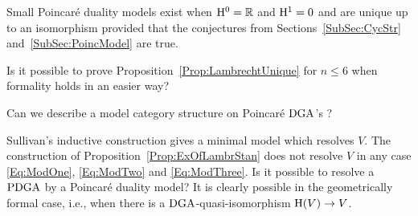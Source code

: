 \documentclass[\MainFolder/Text.tex]{subfiles}
\begin{document}
\begin{Corollary}\label{Cor:SmalPoinc}
Small Poincar\'e duality models exist when $\mathrm{H}^0 = \mathbb{R}$ and $\mathrm{H}^1 = 0$ and are unique up to an isomorphism provided that the conjectures from Sections~\ref{SubSec:CycStr} and~\ref{SubSec:PoincModel} are true.
\end{Corollary}

\begin{Questions}\label{Q:QuestionsPonc}
\begin{RemarkList}

\item Is it possible to prove Proposition~\ref{Prop:LambrechtUnique} for $n\le 6$ when formality holds in an easier way?

\item Can we describe a model category structure on Poincar\'e $\mathrm{DGA}$'s ?

\item Sullivan's inductive construction gives a minimal model which resolves $V$. The construction of Proposition~\ref{Prop:ExOfLambrStan} does not resolve $V$ in any case \eqref{Eq:ModOne}, \eqref{Eq:ModTwo} and \eqref{Eq:ModThree}. Is it possible to resolve a $\mathrm{PDGA}$ by a Poincar\'e duality model? It is clearly possible in the geometrically formal case, i.e., when there is a $\mathrm{DGA}$-quasi-isomorphism $\mathrm{H}(V)\rightarrow V$.
\qedhere
\end{RemarkList}
\end{Questions}
\end{document}
